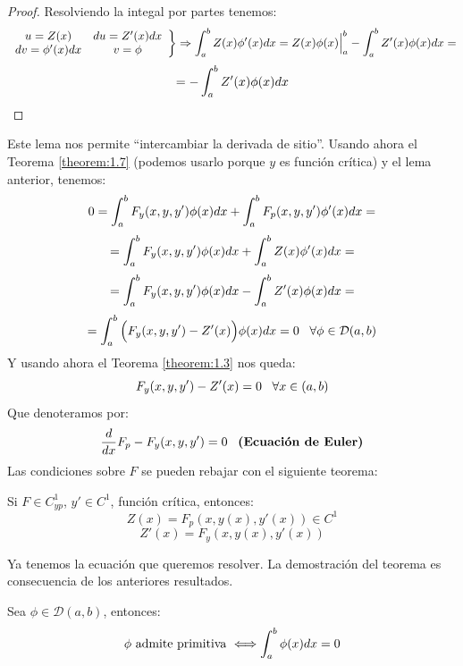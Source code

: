 \begin{proof}

Resolviendo la integal por partes tenemos:
\[
\left.\begin{array}{cc}
u=Z(x) & du=Z'(x)dx\\
dv=\phi'(x)dx & v=\phi
\end{array}\right\} \Rightarrow\displaystyle\int_{ a }^{ b } Z(x)\phi'(x)dx=Z(x)\phi(x)\Big|_a^b-\displaystyle\int_{ a }^{ b } Z'(x)\phi(x)dx=
\]
\[
=-\displaystyle\int_{ a }^{ b } Z'(x)\phi(x)dx
\]

\end{proof}

Este lema nos permite \enquote{intercambiar la derivada de sitio}.
Usando ahora el Teorema \ref{theorem:1.7} (podemos usarlo porque $y$ es función crítica) y el lema anterior, tenemos:
\[
0=\displaystyle\int_{ a }^{ b } F_y(x,y, y')\phi(x)dx+\displaystyle\int_{ a }^{ b } F_p(x,y,y')\phi'(x)dx= 
\]
\[
=\displaystyle\int_{ a }^{ b } F_y(x,y, y')\phi(x)dx+\displaystyle\int_{ a }^{ b } Z(x)\phi'(x)dx=
\]
\[
=\displaystyle\int_{ a }^{ b } F_y(x,y, y')\phi(x)dx-\displaystyle\int_{ a }^{ b } Z'(x)\phi(x)dx=
\]
\[
=\displaystyle\int_{ a }^{ b } \Big(F_y(x,y, y')-Z'(x)\Big)\phi(x)dx=0 \;\;\; \forall\phi\in\mathcal{D}(a,b)
\]
Y usando ahora el Teorema \ref{theorem:1.3} nos queda:
\[
F_y(x,y,y')-Z'(x)=0 \;\;\; \forall x \in(a,b)
\]
Que denoteramos por:
\[
\frac{d}{dx}F_p-F_y(x,y,y')=0 \;\;\; \textbf{(Ecuación de Euler)}
\]
Las condiciones sobre $F$ se pueden rebajar con el siguiente teorema:

\begin{theorem} 
\label{theorem:12}
Si $F\in C^1_{yp}$, $y'\in C^1$, función crítica, entonces:
\[
Z(x)=F_p(x,y(x),y'(x))\in C^1
\]
\[
Z'(x)=F_y(x,y(x),y'(x))
\]
\end{theorem}

Ya tenemos la ecuación que queremos resolver. La demostración del teorema es consecuencia de los anteriores resultados.

\begin{lemma}
\label{lemma:13}
Sea $\phi\in\mathcal{D}(a,b)$, entonces:
\[
\phi \text{ admite primitiva } \Longleftrightarrow \displaystyle\int_{ a }^{ b } \phi(x)dx=0
\]
\end{lemma}

